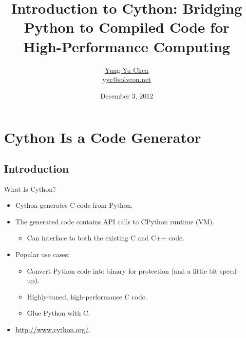 \documentclass[dvips,xcolor=pst,14pt]{beamer}
\title[Cython for HPC]{Introduction to Cython: Bridging Python to Compiled Code
for High-Performance Computing}
\author[\href{http://solvcon.net/yyc/}{Yung-Yu Chen}]%
{\href{http://solvcon.net/yyc/}{Yung-Yu Chen} \\ {\scriptsize
\url{yyc@solvcon.net}}}
\institute[PyHUG]{Python Hsinchu User Group}
\date[2012/12/3]{December 3, 2012}
\begin{document}
\begin{frame}
\titlepage
\end{frame}


\section{
Cython Is a Code Generator
}

\subsection{
Introduction
}

\begin{frame}{
%
What Is Cython?
%
}
\begin{itemize}
\item Cython generates C code from Python.
\item The generated code contains API calls to CPython runtime (VM).
\begin{itemize}
  \item Can interface to both the existing \alert{C} and \alert{C++} code.
\end{itemize}
\item Popular use cases:
\begin{itemize} \normalsize
  \item Convert Python code into binary for protection (and a little bit
  speed-up).
  \item Highly-tuned, high-performance C code.
  \item Glue Python with C.
\end{itemize}
\item \url{http://www.cython.org/}.
\end{itemize}
\end{frame}
\end{document}
